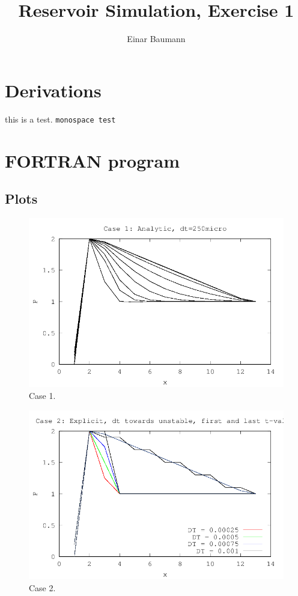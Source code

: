 \documentclass[11pt,a4paper]{article}
\title{Reservoir Simulation, Exercise 1}
\author{Einar Baumann}
\begin{document}
\maketitle

\section{Derivations} %
\label{sec:derivations}
this is a test. \texttt{monospace test}


\pagebreak


\section{FORTRAN program} %
\label{sec:fortran_program}

\subsection{Plots} %
\label{sub:plots}

\begin{figure}[H]
  \centering
  \includegraphics[]{../code/case1.png}
  \caption{Case 1.}
  \label{fig:case1}
\end{figure}

\begin{figure}[H]
  \centering
  \includegraphics[]{../code/case2.png}
  \caption{Case 2.}
  \label{fig:case2}
\end{figure}
\end{document}
